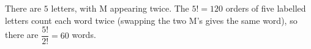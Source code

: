 There are $5$ letters, with M appearing twice. The $5!=120$ orders of five labelled letters count each word twice (swapping the two M's gives the same word), so there are $\dfrac{5!}{2!}=\boxed{60}$ words.

